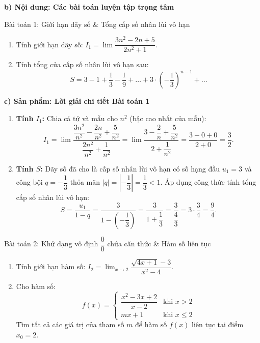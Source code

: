 \documentclass[12pt, a4paper]{article}
\begin{document}
\noindent \textbf{b) Nội dung: Các bài toán luyện tập trọng tâm}

\begin{pedabox}{Bài toán 1: Giới hạn dãy số \& Tổng cấp số nhân lùi vô hạn}
\begin{enumerate}[leftmargin=0.6cm]
    \item Tính giới hạn dãy số: $I_1 = \lim \dfrac{3n^2 - 2n + 5}{2n^2 + 1}$.
    \item Tính tổng của cấp số nhân lùi vô hạn sau:
    $$S = 3 - 1 + \dfrac{1}{3} - \dfrac{1}{9} + \dots + 3 \cdot \left(-\dfrac{1}{3}\right)^{n-1} + \dots$$
\end{enumerate}
\end{pedabox}

\noindent \textbf{c) Sản phẩm: Lời giải chi tiết Bài toán 1}
\begin{enumerate}[leftmargin=0.6cm]
    \item \textbf{Tính $I_1$:}
    Chia cả tử và mẫu cho $n^2$ (bậc cao nhất của mẫu):
    $$I_1 = \lim \dfrac{\dfrac{3n^2}{n^2} - \dfrac{2n}{n^2} + \dfrac{5}{n^2}}{\dfrac{2n^2}{n^2} + \dfrac{1}{n^2}} = \lim \dfrac{3 - \dfrac{2}{n} + \dfrac{5}{n^2}}{2 + \dfrac{1}{n^2}} = \dfrac{3 - 0 + 0}{2 + 0} = \dfrac{3}{2}.$$
    \item \textbf{Tính $S$:}
    Dãy số đã cho là cấp số nhân lùi vô hạn có số hạng đầu $u_1 = 3$ và công bội $q = -\dfrac{1}{3}$ thỏa mãn $|q| = \left|-\dfrac{1}{3}\right| = \dfrac{1}{3} < 1$.
    Áp dụng công thức tính tổng cấp số nhân lùi vô hạn:
    $$S = \dfrac{u_1}{1 - q} = \dfrac{3}{1 - \left(-\dfrac{1}{3}\right)} = \dfrac{3}{1 + \dfrac{1}{3}} = \dfrac{3}{\dfrac{4}{3}} = 3 \cdot \dfrac{3}{4} = \dfrac{9}{4}.$$
\end{enumerate}

\begin{pedabox}{Bài toán 2: Khử dạng vô định $\dfrac{0}{0}$ chứa căn thức \& Hàm số liên tục}
\begin{enumerate}[leftmargin=0.6cm]
    \item Tính giới hạn hàm số: $I_2 = \lim_{x \to 2} \dfrac{\sqrt{4x + 1} - 3}{x^2 - 4}$.
    \item Cho hàm số:
    $$f(x) = \begin{cases} \dfrac{x^2 - 3x + 2}{x - 2} & \text{khi } x > 2 \\ mx + 1 & \text{khi } x \le 2 \end{cases}$$
    Tìm tất cả các giá trị của tham số $m$ để hàm số $f(x)$ liên tục tại điểm $x_0 = 2$.
\end{enumerate}
\end{pedabox}
\end{document}
